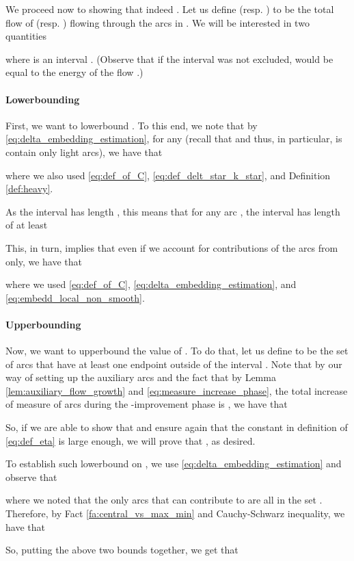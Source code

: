\documentclass[11pt, letterpaper]{article}
\begin{document}
We proceed now to showing that indeed . Let us define  (resp. ) to be the total flow of  (resp. ) flowing through the arcs in . We will be interested in two quantities

where  is an interval . (Observe that if the interval  was not excluded,  would be equal to the energy  of the flow .)

\paragraph{Lowerbounding } First, we want to lowerbound . To this end, we note that by \eqref{eq:delta_embedding_estimation}, for any  (recall that  and thus, in particular, is contain only light arcs), we have that

where we also used \eqref{eq:def_of_C}, \eqref{eq:def_delt_star_k_star}, and Definition \ref{def:heavy}.

As the interval  has length , this means that for any arc , the interval  has length of at least 


This, in turn, implies that even if we account  for contributions of the arcs from  only, we have that

where we used \eqref{eq:def_of_C}, \eqref{eq:delta_embedding_estimation}, and \eqref{eq:embedd_local_non_smooth}. 

\paragraph{Upperbounding } Now, we want to upperbound the value of . To do that, let us define  to be the set of arcs that have at least one endpoint outside of the interval . Note that by our way of setting up the auxiliary arcs and the fact that by Lemma \ref{lem:auxiliary_flow_growth} and \eqref{eq:measure_increase_phase}, the total increase of measure of arcs during the -improvement phase is , we have that
 
So, if we are able to show that  and ensure again that the constant  in definition of  \eqref{eq:def_eta} is large enough, we will prove that , as desired. 


To establish such lowerbound on , we use \eqref{eq:delta_embedding_estimation} and observe that

where we noted that the only arcs that can contribute to  are all in the set . 
Therefore, by Fact \ref{fa:central_vs_max_min} and Cauchy-Schwarz inequality, we have that

So, putting the above two bounds together, we get that
\end{document}
